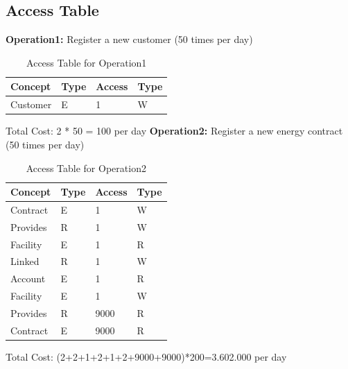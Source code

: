 \subsection{Access Table}

\textbf{Operation1:} Register a new customer (50 times per day)\\
\begin{table}[H]
    \renewcommand{\arraystretch}{1.3} %
    \begin{tabularx}{\textwidth}{|X|X|X|X|}
    \hline
    \textbf{Concept}& \textbf{Type}  & \textbf{Access}    & \textbf{Type}     \\ \hline
    Customer & E & 1 & W \\ \hline
    \end{tabularx}
    \caption{Access Table for Operation1}
\end{table}
\noindent Total Cost: 2 * 50 = 100 per day
\newline
\textbf{Operation2:} Register a new energy contract (50 times per day)\\
\begin{table}[H]
    \renewcommand{\arraystretch}{1.3} %
    \begin{tabularx}{\textwidth}{|X|X|X|X|}
    \hline
    \textbf{Concept}& \textbf{Type}  & \textbf{Access}    & \textbf{Type}     \\ \hline
    Contract & E & 1 & W \\ \hline
    Provides & R & 1 & W \\ \hline
    Facility & E & 1 & R \\ \hline
    Linked & R & 1 & W \\ \hline
    Account & E & 1 & R \\ \hline
    Facility & E & 1 & W \\ \hline
    Provides & R & 9000 & R \\ \hline
    Contract & E & 9000 & R \\ \hline
    \end{tabularx}
    \caption{Access Table for Operation2}
\end{table}
\noindent Total Cost: (2+2+1+2+1+2+9000+9000)*200=3.602.000 per day

